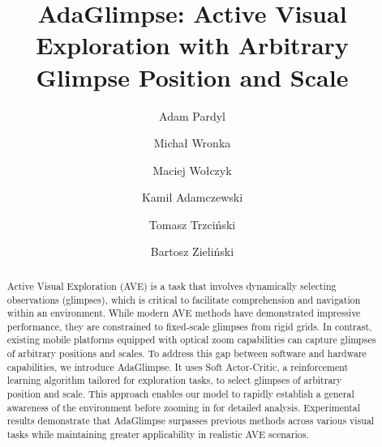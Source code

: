 \documentclass[runningheads]{llncs}
\newcommand{\ours}[0]{AdaGlimpse}
\begin{document}
\title{\ours{}: Active Visual Exploration with Arbitrary Glimpse Position and Scale} 

\titlerunning{\ours{}}

\author{Adam Pardyl \and %
Michał Wronka \and %
Maciej Wołczyk \and %
Kamil Adamczewski \and %
Tomasz Trzciński \and %
Bartosz Zieliński} %



\maketitle


\begin{abstract}
Active Visual Exploration (AVE) is a task that involves dynamically selecting observations (glimpses), which is critical to facilitate comprehension and navigation 
 within an environment. While modern AVE methods have demonstrated impressive performance, they are constrained to fixed-scale glimpses from rigid grids. In contrast, existing mobile platforms equipped with optical zoom capabilities can capture glimpses of arbitrary positions and scales.
To address this gap between software and hardware capabilities, we introduce \ours{}. It uses Soft Actor-Critic, a reinforcement learning algorithm tailored for exploration tasks, to select glimpses of arbitrary position and scale. This approach enables our model to rapidly establish a general awareness of the environment before zooming in for detailed analysis.
Experimental results demonstrate that \ours{} surpasses previous methods across various visual tasks while maintaining greater applicability in realistic AVE scenarios.

\end{abstract}
\end{document}
